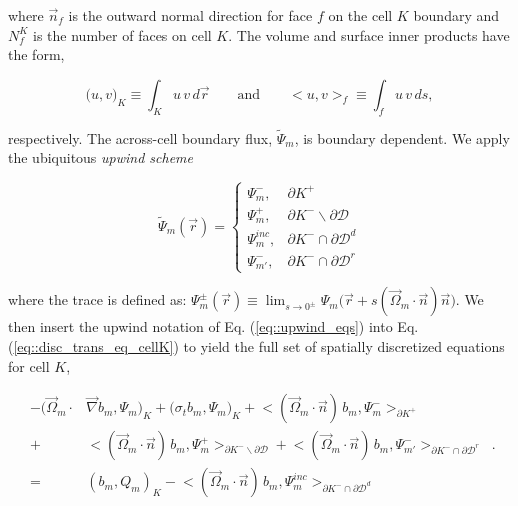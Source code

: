 \documentclass[11pt]{article}
\begin{document}
\noindent where $\vec{n}_f$ is the outward normal direction for face $f$ on the cell $K$ boundary and $N_f^K$ is the number of faces on cell $K$. The volume and surface inner products have the form,

\begin{equation}
\label{eq::inner_prod}
\Big( u,v \Big)_K \equiv \int_K u \, v \, d \vec{r} \qquad \text{and} \qquad \Big< u,v \Big>_f \equiv \int_f u \, v \, d s ,
\end{equation}

\noindent respectively. The across-cell boundary flux, $\tilde{\Psi}_m$, is boundary dependent. We apply the ubiquitous {\em upwind scheme} 

\begin{equation}
\label{eq::upwind_eqs}
\tilde{\Psi}_m (\vec{r})  = 
\begin{cases}
\Psi_m^{-} , & \partial K^+ \\
\Psi_m^{+}, & \partial K^- \backslash \partial \mathcal{D} \\
\Psi_m^{inc}, & \partial K^- \cap \partial \mathcal{D}^d \\
\Psi_{m'}^{-}, & \partial K^- \cap \partial \mathcal{D}^r
\end{cases}
\end{equation}

\noindent where the trace is defined as: $\Psi_m^{\pm} (\vec{r}) \equiv \lim_{s \rightarrow 0^{\pm}} \Psi_m \Big( \vec{r} + s (\vec{\Omega}_m \cdot \vec{n}) \vec{n} \Big)$. We then insert the upwind notation of Eq. (\ref{eq::upwind_eqs}) into Eq. (\ref{eq::disc_trans_eq_cellK}) to yield the full set of spatially discretized equations for cell $K$,

\begin{equation}
\label{eq::full_cellK_disc}
\begin{aligned}
-  \Big( \vec{\Omega}_m \cdot  & \vec{\nabla} b_m, \Psi_{m} \Big)_{K}   + \Big(  \sigma_{t} b_m ,   \Psi_{m} \Big)_{K} +  \Big< ( \vec{\Omega}_m \cdot \vec{n} ) \, b_m, {\Psi}_m^{-}  \Big>_{\partial K^+}  \\
  + & \Big< ( \vec{\Omega}_m \cdot \vec{n} ) \, b_m, {\Psi}_m^{+}  \Big>_{\partial K^- \backslash \partial \mathcal{D}}  + \Big< ( \vec{\Omega}_m \cdot \vec{n} ) \, b_m, {\Psi}^{-}_{m'}  \Big>_{\partial K^- \cap \partial \mathcal{D}^r}  \\
= & \left(  b_m ,   Q_m \right)_{K} - \Big< ( \vec{\Omega}_m \cdot \vec{n} ) \, b_m, {\Psi}_m^{inc}  \Big>_{\partial K^- \cap \partial \mathcal{D}^d} 
\end{aligned} \, .
\end{equation}
\end{document}
